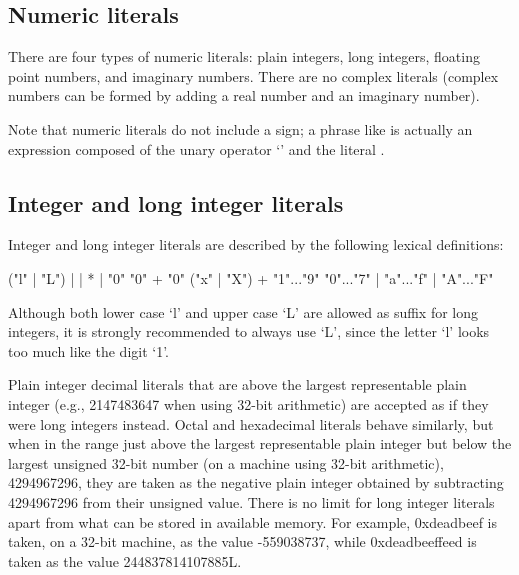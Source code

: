 \subsection{Numeric literals\label{numbers}}

There are four types of numeric literals: plain integers, long
integers, floating point numbers, and imaginary numbers.  There are no
complex literals (complex numbers can be formed by adding a real
number and an imaginary number).

Note that numeric literals do not include a sign; a phrase like
 is actually an expression composed of the unary operator
`\code{-}' and the literal .


\subsection{Integer and long integer literals\label{integers}}

Integer and long integer literals are described by the following
lexical definitions:

\begin{productionlist}
             { ("l" | "L")}
             { |  | }
             { * | "0"}
             {"0" +}
             {"0" ("x" | "X") +}
             {"1"..."9"}
             {"0"..."7"}
             { | "a"..."f" | "A"..."F"}
\end{productionlist}

Although both lower case `l' and upper case `L' are allowed as suffix
for long integers, it is strongly recommended to always use `L', since
the letter `l' looks too much like the digit `1'.

Plain integer decimal literals that are above the largest representable
plain integer (e.g., 2147483647 when using 32-bit arithmetic) are accepted
as if they were long integers instead.  Octal and hexadecimal literals
behave similarly, but when in the range just above the largest representable
plain integer but below the largest unsigned 32-bit number (on a machine
using 32-bit arithmetic), 4294967296, they are taken as the negative plain
integer obtained by subtracting 4294967296 from their unsigned value.  There
is no limit for long integer literals apart from what can be stored in
available memory.  For example, 0xdeadbeef is taken, on a 32-bit machine,
as the value -559038737, while 0xdeadbeeffeed is taken as the value
244837814107885L.

